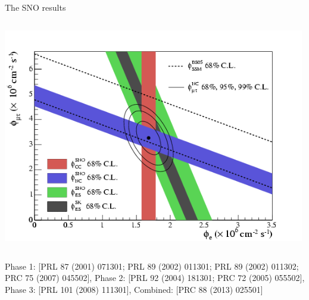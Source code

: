 \begin{frame}[t]{The SNO results}
\begin{columns}
\begin{column}{0.65\textwidth}
     \includegraphics[width=0.99\textwidth]{./images/3nu/solar/sno_results_4lines_nolabels.png}\\
  \end{column}
\end{columns}
{\tiny
 Phase 1: {\color{blue} [PRL 87 (2001) 071301; PRL 89 (2002) 011301; PRL 89 (2002) 011302; PRC 75 (2007) 045502]},
 Phase 2: {\color{blue} [PRL 92 (2004) 181301; PRC 72 (2005) 055502]},
 Phase 3: {\color{blue} [PRL 101 (2008) 111301]},
 Combined:{\color{blue} [PRC 88 (2013) 025501]}\\
}
\end{frame}


